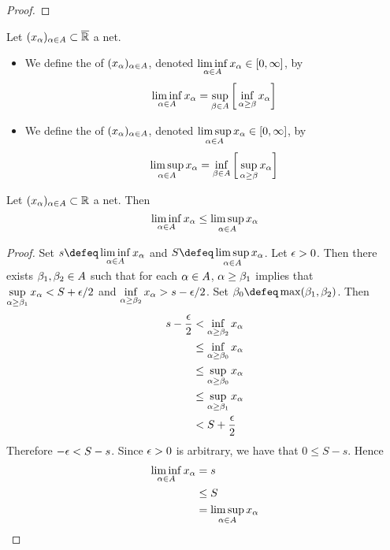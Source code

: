 \documentclass{book}
\begin{document}
	\begin{proof}
	\end{proof}
	
	
	\begin{defn} 
		Let $(x_{\alpha})_{\alpha \in A} \subset \overline{\mathbb{R}}$ a net. 
		\begin{itemize}
			\item We define the  of $(x_{\alpha})_{\alpha \in A}$, denoted $\liminf \limits_{\alpha \in A} x_{\alpha} \in [0,\infty]$, by 
			$$\liminf\limits_{\alpha \in A} x_{\alpha} = \sup_{\beta \in A } \bigg[  \inf_{\alpha \geq \beta} x_{\alpha} \bigg]$$ 
			\item We define the  of $(x_{\alpha})_{\alpha \in A}$, denoted $\limsup\limits_{\alpha \in A} x_{\alpha} \in [0,\infty]$, by
			$$\limsup\limits_{\alpha \in A} x_{\alpha} = \inf_{\beta \in A } \bigg[ \sup_{\alpha \geq \beta} x_{\alpha} \bigg]$$   
		\end{itemize}
	\end{defn}

	\begin{ex} 
		Let $(x_{\alpha})_{\alpha \in A} \subset \mathbb{R}$ a net. Then
		 $$\liminf\limits_{\alpha \in A} x_{\alpha} \leq \limsup\limits_{\alpha \in A} x_{\alpha}$$
	\end{ex}

	\begin{proof}
		Set $s \defeq \liminf\limits_{\al \in A} x_{\al}$ and $S \defeq \limsup\limits_{\al \in A} x_{\al}$. Let $\epsilon > 0$. Then there exists $\beta_1, \beta_2 \in A$ such that for each $\alpha \in A$, $\alpha \geq \beta_1$ implies that $\sup\limits_{\alpha \geq \beta_1} x_{\alpha} < S + \epsilon/2$ and $\inf\limits_{\alpha \geq \beta_2} x_{\alpha} > s - \epsilon/2$. Set $\be_0 \defeq \max(\be_1 , \be_2)$. Then 
		\begin{align*}
			s - \frac{\epsilon}{2}
			& < \inf\limits_{\alpha \geq \beta_2} x_{\alpha} \\
			& \leq \inf\limits_{\alpha \geq \beta_0} x_{\alpha} \\
			& \leq \sup\limits_{\alpha \geq \beta_0} x_{\alpha} \\
			& \leq \sup\limits_{\alpha \geq \beta_1} x_{\alpha} \\
			& < S + \frac{\epsilon}{2}
		\end{align*}
		Therefore $-\epsilon < S-s $. Since $\epsilon > 0$ is arbitrary, we have that $0 \leq S - s$. Hence
		\begin{align*}
			\liminf\limits_{\alpha \in A} x_{\alpha}
			& = s \\
			& \leq S \\
			& = \limsup\limits_{\alpha \in A} x_{\alpha}
		\end{align*}
	\end{proof}
\end{document}
